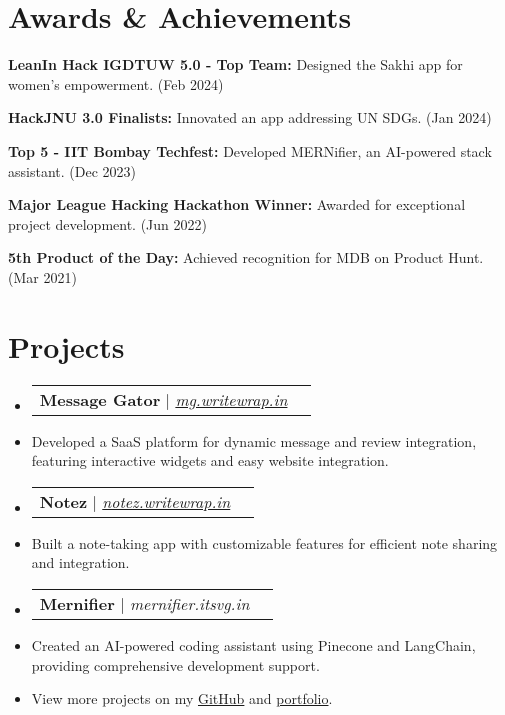 \documentclass[letterpaper,11pt]{article}
\makeatletter
\newcommand{\resumeItem}[1]{
  \item\small{
    {#1 \vspace{-2pt}}
  }
}
\newcommand{\resumeProjectHeading}[2]{
    \vspace{-2pt}\item
    \begin{tabular*}{0.97\textwidth}{l@{\extracolsep{\fill}}r}
      \small#1 & #2 \\
    \end{tabular*}\vspace{-7pt}
}
\newcommand{\resumeSubHeadingListStart}{\begin{itemize}[leftmargin=0.15in, label={}]}
\newcommand{\resumeSubHeadingListEnd}{\end{itemize}}
\makeatother
\begin{document}
\section{Awards \& Achievements}
  \vspace{2pt}
  \resumeSubHeadingListStart
  \small{
    \item{
    
    \textbf{LeanIn Hack IGDTUW 5.0 - Top Team:}{ Designed the Sakhi app for women's empowerment. (Feb 2024)}
    
    \textbf{HackJNU 3.0 Finalists:}{ Innovated an app addressing UN SDGs. (Jan 2024)}
    
    \textbf{Top 5 - IIT Bombay Techfest:}{ Developed MERNifier, an AI-powered stack assistant. (Dec 2023)}
    
    \textbf{Major League Hacking Hackathon Winner:}{ Awarded for exceptional project development. (Jun 2022)}
    
    \textbf{5th Product of the Day:}{ Achieved recognition for MDB on Product Hunt. (Mar 2021)}

    }}
  \resumeSubHeadingListEnd

\section{Projects}
    \resumeSubHeadingListStart
    
    \resumeProjectHeading{\textbf{Message Gator} | \emph{\href{http://mg.writewrap.in}{mg.writewrap.in}}}{}
    \resumeItem{Developed a SaaS platform for dynamic message and review integration, featuring interactive widgets and easy website integration.}
    
    \resumeProjectHeading{\textbf{Notez} | \emph{\href{http://notez.writewrap.in}{notez.writewrap.in}}}{}
    \resumeItem{Built a note-taking app with customizable features for efficient note sharing and integration.}
    
    \resumeProjectHeading{\textbf{Mernifier} | \emph{mernifier.itsvg.in}}{}
    \resumeItem{Created an AI-powered coding assistant using Pinecone and LangChain, providing comprehensive development support.}
    
    \resumeItem{View more projects on my \href{http://github.com/pushkarydv}{GitHub} and \href{https://pushkaryadav.in}{portfolio}.}
    
    \resumeSubHeadingListEnd

\end{document}
